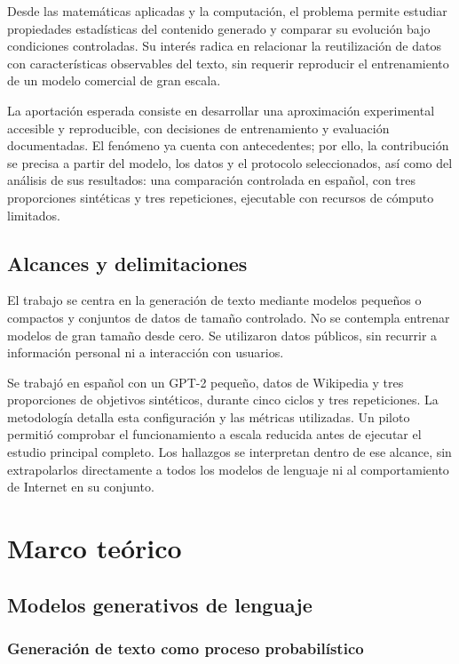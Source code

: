 \documentclass[12pt,letterpaper]{article}
\begin{document}
Desde las matemáticas aplicadas y la computación, el problema permite
estudiar propiedades estadísticas del contenido generado y comparar su
evolución bajo condiciones controladas. Su interés radica en relacionar
la reutilización de datos con características observables del texto, sin
requerir reproducir el entrenamiento de un modelo comercial de gran escala.

La aportación esperada consiste en desarrollar una aproximación experimental
accesible y reproducible, con decisiones de entrenamiento y evaluación
documentadas. El fenómeno ya cuenta con antecedentes; por ello, la
contribución se precisa a partir del modelo, los datos y el protocolo
seleccionados, así como del análisis de sus resultados: una comparación
controlada en español, con tres proporciones sintéticas y tres repeticiones,
ejecutable con recursos de cómputo limitados.

\subsection{Alcances y delimitaciones}

El trabajo se centra en la generación de texto mediante modelos pequeños o
compactos y conjuntos de datos de tamaño controlado. No se contempla
entrenar modelos de gran tamaño desde cero. Se utilizaron datos
públicos, sin recurrir a información personal
ni a interacción con usuarios.

Se trabajó en español con un GPT-2 pequeño, datos de Wikipedia y
tres proporciones de objetivos sintéticos, durante cinco ciclos y tres
repeticiones. La metodología detalla esta configuración y las métricas
utilizadas. Un piloto permitió comprobar el funcionamiento a escala reducida
antes de ejecutar el estudio principal completo. Los hallazgos se interpretan dentro de ese alcance,
sin extrapolarlos directamente a todos los modelos de lenguaje ni al
comportamiento de Internet en su conjunto.

\section{Marco teórico}

\subsection{Modelos generativos de lenguaje}

\subsubsection{Generación de texto como proceso probabilístico}
\end{document}
